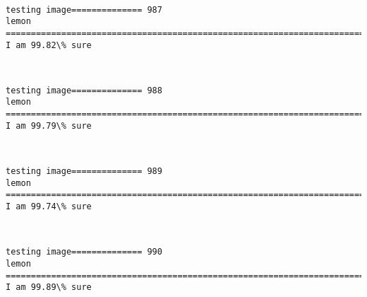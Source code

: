 \documentclass[11pt]{article}
\begin{document}
    \begin{center}
    \end{center}
    { \hspace*{\fill} \\}
    
    \begin{Verbatim}[commandchars=\\\{\}]
testing image============== 987
lemon
============================================================================
I am 99.82\% sure

    \end{Verbatim}

    \begin{center}
    \end{center}
    { \hspace*{\fill} \\}
    
    \begin{Verbatim}[commandchars=\\\{\}]
testing image============== 988
lemon
============================================================================
I am 99.79\% sure

    \end{Verbatim}

    \begin{center}
    \end{center}
    { \hspace*{\fill} \\}
    
    \begin{Verbatim}[commandchars=\\\{\}]
testing image============== 989
lemon
============================================================================
I am 99.74\% sure

    \end{Verbatim}

    \begin{center}
    \end{center}
    { \hspace*{\fill} \\}
    
    \begin{Verbatim}[commandchars=\\\{\}]
testing image============== 990
lemon
============================================================================
I am 99.89\% sure

    \end{Verbatim}
\end{document}
